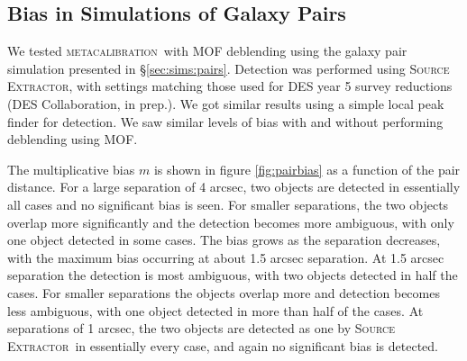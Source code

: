 \documentclass[fleqn,useAMS,usenatbib]{mnras}
\newcommand{\mcal}{\textsc{metacalibration}}
\newcommand{\sx}{\textsc{Source Extractor}}
\begin{document}
\subsection{Bias in Simulations of Galaxy Pairs}

We tested \mcal\ with MOF deblending using the galaxy pair simulation presented
in \S \ref{sec:sims:pairs}. Detection was performed using \sx, with settings
matching those used for DES year 5 survey reductions (DES Collaboration, in prep.).
We got similar results using a simple local peak finder for detection.
We saw similar levels of bias with and without performing deblending using MOF.

The multiplicative bias $m$ is shown in figure \ref{fig:pairbias} as a function
of the pair distance. For a large separation of 4 arcsec, two objects are
detected in essentially all cases and no significant bias is seen.  For smaller
separations, the two objects overlap more significantly and the detection
becomes more ambiguous, with only one object detected in some cases.  The bias
grows as the separation decreases, with the maximum bias occurring at about 1.5
arcsec separation. At 1.5 arcsec separation the detection is most ambiguous,
with two objects detected in half the cases. For smaller separations the
objects overlap more and detection becomes less ambiguous, with one object
detected in more than half of the cases. At separations of 1 arcsec, the two
objects are detected as one by \sx\ in essentially every case, and again no
significant bias is detected.
\end{document}
